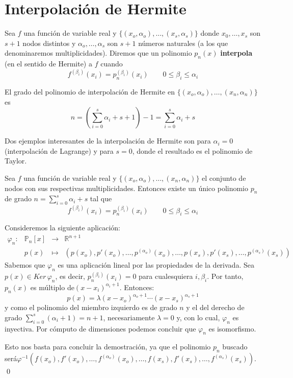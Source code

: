         \section{Interpolación de Hermite}
        \begin{defin}
        Sea $f$ una función de variable real y $\{(x_o,\alpha_o),\ldots,(x_s,\alpha_s)\}$ donde $x_0,\ldots,x_s$ son $s+1$ nodos distintos y $\alpha_o,\ldots,\alpha_s$ son $s+1$ números naturales (a los que denominaremos multiplicidades). Diremos que un polinomio $p_n(x)$ \textbf{interpola} (en el sentido de Hermite) a $f$ cuando
        $$f^{(\beta_i)}(x_i)=p_n^{(\beta_i)}(x_i)\qquad 0\leq \beta_i\leq\alpha_i$$
        \end{defin}
        \begin{obs}
        El grado del polinomio de interpolación de Hermite en $\{(x_o,\alpha_o),\ldots,(x_n,\alpha_n)\}$ es
        $$n=\left(\sum_{i=0}^s\alpha_i +s+1\right)-1=\sum_{i=0}^s\alpha_i +s$$
         \end{obs}
        \begin{ejem}
        Dos ejemplos interesantes de la interpolación de Hermite son para $\alpha_i=0$ (interpolación de Lagrange) y para $s=0$, donde el resultado es el polinomio de Taylor.
        
        \end{ejem}
        \begin{teo}
        Sea $f$ una función de variable real y $\{(x_o,\alpha_o),\ldots,(x_n,\alpha_n)\}$ el conjunto de nodos con sus respectivas multiplicidades. Entonces existe un único polinomio $p_n$ de grado $n=\sum_{i=0}^s\alpha_i +s$ tal que
        $$f^{(\beta_i)}(x_i)=p_n^{(\beta_i)}(x_i)\qquad 0\leq \beta_i\leq\alpha_i$$
        \end{teo}
        \begin{dem}
        Consideremos la siguiente aplicación:
        $$\begin{array}{rrcl}
        \varphi_n:&\mathbb{P}_n[x]     &\longrightarrow & \mathbb{R}^{n+1}  \\
          &p(x)   &\longmapsto & (p(x_o),p'(x_o),\ldots,p^{(\alpha_o)}(x_o),\ldots, p(x_s),p'(x_s),\ldots,p^{(\alpha_s)}(x_s) )
        \end{array}$$
        Sabemos que $\varphi_n$ es una aplicación lineal por las propiedades de la derivada. Sea $p(x)\in Ker \,\varphi_n$, es decir, $p_n^{(\beta_i)}(x_i)=0$ para cualesquiera $i,\beta_i$. Por tanto,  $p_n(x)$ es múltiplo de$(x-x_i)^{\alpha_i+1}$. Entonces:
        $$p(x)=\lambda (x-x_o)^{\alpha_o+1}\cdots(x-x_s)^{\alpha_s+1}$$
        y como el polinomio del miembro izquierdo es de grado $n$ y el del derecho de grado $\sum_{i=0}^s(\alpha_i+1)=n+1$,  necesariamente $\lambda=0$ y, con lo cual, $\varphi_n$ es inyectiva. Por cómputo de dimensiones podemos concluir que $\varphi_n$ es isomorfismo.

        Esto nos basta para concluir la demostración, ya que el polinomio $p_n$ buscado será\newline $\varphi^{-1}(f(x_o),f'(x_o),\ldots,f^{(\alpha_o)}(x_o),\ldots, f(x_s),f'(x_s),\ldots,f^{(\alpha_s)}(x_s) )$.
        \qed\end{dem}
